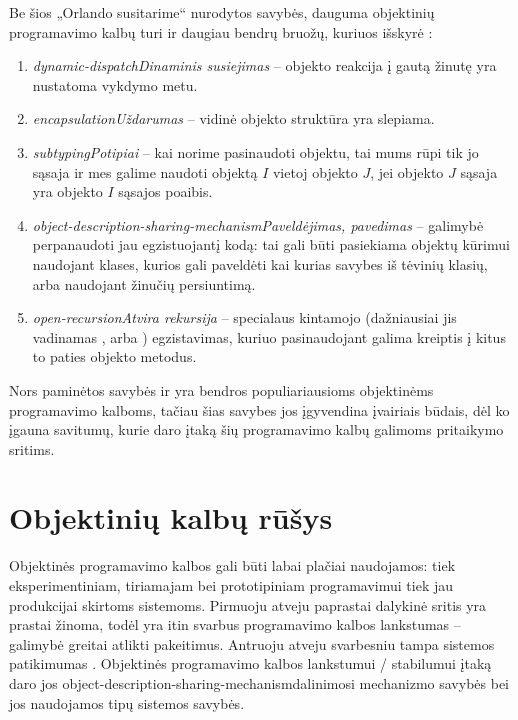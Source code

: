 Be šios „Orlando susitarime“ nurodytos savybės, dauguma
objektinių programavimo kalbų turi ir daugiau bendrų bruožų,
kuriuos išskyrė \cite[225-227]{types-and-programming-languages}:
\begin{enumerate}
  \item \emph{\gls{dynamic-dispatch}{Dinaminis susiejimas}} –
    objekto reakcija į gautą žinutę yra nustatoma vykdymo metu.
  \item \emph{\gls{encapsulation}{Uždarumas}} – vidinė objekto
    struktūra yra slepiama.
  \item \emph{\gls{subtyping}{Potipiai}} – kai norime pasinaudoti objektu, 
    tai mums rūpi tik jo sąsaja ir mes galime naudoti objektą $I$ vietoj
    objekto $J$, jei objekto $J$ sąsaja yra objekto $I$ sąsajos poaibis.
  \item \emph{\gls{object-description-sharing-mechanism}{Paveldėjimas,
    pavedimas}} – galimybė perpanaudoti jau egzistuojantį kodą: tai
    gali būti pasiekiama objektų kūrimui naudojant klases, kurios
    gali paveldėti kai kurias savybes iš tėvinių klasių, arba
    naudojant žinučių persiuntimą.
  \item \emph{\gls{open-recursion}{Atvira rekursija}} – specialaus
    kintamojo (dažniausiai jis vadinamas , arba
    ) egzistavimas, kuriuo pasinaudojant galima kreiptis
    į kitus to paties objekto metodus.
\end{enumerate}
Nors paminėtos savybės ir yra bendros populiariausioms objektinėms
programavimo kalboms, tačiau šias savybes jos įgyvendina įvairiais
būdais, dėl ko įgauna savitumų, kurie daro įtaką šių
programavimo kalbų galimoms pritaikymo sritims.

\section{Objektinių kalbų rūšys}

Objektinės programavimo kalbos gali būti labai plačiai naudojamos:
tiek eksperimentiniam, tiriamajam bei prototipiniam programavimui tiek
jau produkcijai skirtoms sistemoms. Pirmuoju atveju paprastai dalykinė
sritis yra prastai žinoma, todėl yra itin svarbus programavimo kalbos
lankstumas – galimybė greitai atlikti pakeitimus. Antruoju atveju
svarbesniu tampa sistemos patikimumas
\cite{Lieberman:1987:TO:62139.62144}. Objektinės programavimo kalbos
lankstumui / stabilumui įtaką daro jos 
\gls{object-description-sharing-mechanism}{dalinimosi mechanizmo}
savybės \cite{Lieberman:1987:TO:62139.62144} bei jos naudojamos
tipų sistemos savybės.

